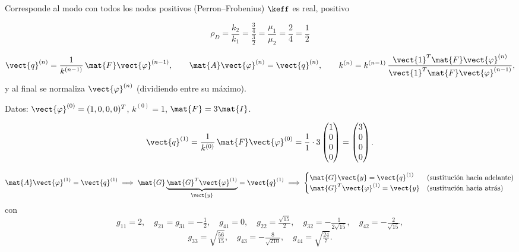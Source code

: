 Corresponde al modo con todos los nodos positivos (Perron--Frobenius) $\keff$ es real, positivo

\[
\rho_D = \frac{k_2}{k_1} = \frac{\frac34}{\frac32} = \frac{\mu_1}{\mu_2} = \frac24 = \frac12
\]


\[
\vect{q}^{(n)} = \frac{1}{k^{(n-1)}}\,\mat{F}\vect{\varphi}^{(n-1)},
\qquad
\mat{A}\vect{\varphi}^{(n)} = \vect{q}^{(n)},
\qquad
k^{(n)} = k^{(n-1)}\,\frac{\vect{1}^T\mat{F}\vect{\varphi}^{(n)}}{\vect{1}^T\mat{F}\vect{\varphi}^{(n-1)}},
\]
y al final se normaliza $\vect{\varphi}^{(n)}$ (dividiendo entre su máximo).

Datos: $\vect{\varphi}^{(0)} = (1, 0, 0, 0)^T$, $k^{(0)} = 1$, $\mat{F} = 3\mat{I}$.

\[
\vect{q}^{(1)} = \frac{1}{k^{(0)}}\,\mat{F}\vect{\varphi}^{(0)} = \frac11\cdot 3\begin{pmatrix} 1\\ 0\\ 0\\ 0 \end{pmatrix}
= \begin{pmatrix} 3\\ 0\\ 0\\ 0 \end{pmatrix}.
\]

\[
\mat{A}\vect{\varphi}^{(1)} = \vect{q}^{(1)}
\;\Longrightarrow\;
\mat{G}\underbrace{\mat{G}^T\vect{\varphi}^{(1)}}_{\vect{y}} = \vect{q}^{(1)}
\;\Longrightarrow\;
\begin{cases}
	\mat{G}\vect{y} = \vect{q}^{(1)} & \text{(sustitución hacia adelante)}\\
	\mat{G}^T\vect{\varphi}^{(1)} = \vect{y} & \text{(sustitución hacia atrás)}
\end{cases}
\]
con
\[
g_{11} = 2,\quad g_{21} = g_{31} = -\tfrac12,\quad g_{41} = 0,\quad g_{22} = \tfrac{\sqrt{15}}{2},\quad
g_{32} = -\tfrac{1}{2\sqrt{15}},\quad g_{42} = -\tfrac{2}{\sqrt{15}},
\]
\[
g_{33} = \sqrt{\tfrac{56}{15}},\quad g_{43} = -\tfrac{8}{\sqrt{210}},\quad g_{44} = \sqrt{\tfrac{24}{7}} .
\]

